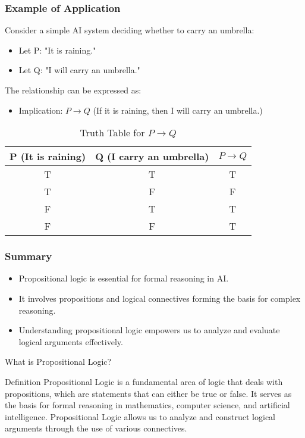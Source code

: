 \documentclass[aspectratio=169]{beamer}
\begin{document}
\begin{frame}[fragile]
    \frametitle{Example of Application}
    Consider a simple AI system deciding whether to carry an umbrella:
    \begin{itemize}
        \item Let P: "It is raining."
        \item Let Q: "I will carry an umbrella."
    \end{itemize}
    
    The relationship can be expressed as:
    \begin{itemize}
        \item Implication: $P \rightarrow Q$ (If it is raining, then I will carry an umbrella.)
    \end{itemize}
    
    \begin{table}[ht]
        \centering
        \begin{tabular}{|c|c|c|}
            \hline
            P (It is raining) & Q (I carry an umbrella) & $P \rightarrow Q$  \\
            \hline
            T & T & T \\
            T & F & F \\
            F & T & T \\
            F & F & T \\
            \hline
        \end{tabular}
        \caption{Truth Table for $P \rightarrow Q$}
    \end{table}
\end{frame}

\begin{frame}[fragile]
    \frametitle{Summary}
    \begin{itemize}
        \item Propositional logic is essential for formal reasoning in AI.
        \item It involves propositions and logical connectives forming the basis for complex reasoning.
        \item Understanding propositional logic empowers us to analyze and evaluate logical arguments effectively.
    \end{itemize}
\end{frame}

\begin{frame}[fragile]{What is Propositional Logic?}
    \begin{block}{Definition}
        Propositional Logic is a fundamental area of logic that deals with propositions, which are statements that can either be true or false. 
        It serves as the basis for formal reasoning in mathematics, computer science, and artificial intelligence. 
        Propositional Logic allows us to analyze and construct logical arguments through the use of various connectives.
    \end{block}
\end{frame}
\end{document}
